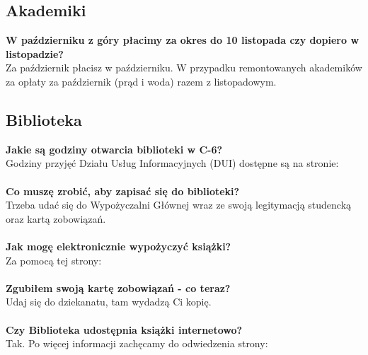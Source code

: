 \documentclass[11pt]{article}
\begin{document}
\subsection{Akademiki}
\textbf{W październiku z góry płacimy za okres do 10 listopada czy dopiero w listopadzie?} \\
\indent Za październik płacisz w październiku. W przypadku remontowanych akademików za opłaty za październik (prąd i woda) razem z listopadowym. 
\subsection{Biblioteka} 
\textbf{Jakie są godziny otwarcia biblioteki w C-6?} \\
Godziny przyjęć Działu Usług Informacyjnych (DUI) dostępne są na stronie: {} \\\\
\textbf{Co muszę zrobić, aby zapisać się do biblioteki?} \\
\indent Trzeba udać się do Wypożyczalni Głównej wraz ze swoją legitymacją studencką oraz kartą zobowiązań. \\\\
\textbf{Jak mogę elektronicznie wypożyczyć książki?} \\
\indent Za pomocą tej strony:
{} \\\\
\textbf{Zgubiłem swoją kartę zobowiązań - co teraz?} \\
\indent Udaj się do dziekanatu, tam wydadzą Ci kopię. \\\\
\textbf{Czy Biblioteka udostępnia książki internetowo?} \\
\indent Tak. Po więcej informacji zachęcamy do odwiedzenia strony:
{}
\end{document}
